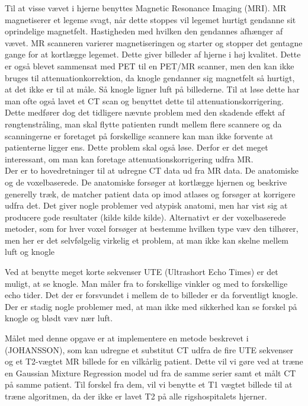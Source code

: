 Til at visse vævet i hjerne benyttes Magnetic Resonance Imaging (MRI). MR
magnetiserer et legeme svagt, når dette stoppes vil legemet hurtigt gendanne
sit oprindelige magnetfelt. Hastigheden med hvilken den gendannes afhænger
af vævet. MR scanneren varierer magnetiseringen og starter og stopper det
gentagne gange for at kortlægge legemet. Dette giver billeder af hjerne i
høj kvalitet. Dette er også blevet sammensat med PET til en PET/MR scanner,
men den kan ikke bruges til attenuationkorrektion, da knogle gendanner sig
magnetfelt så hurtigt, at det ikke er til at måle. Så knogle ligner luft på
billederne. Til at løse dette har man ofte også lavet et CT scan og benyttet
dette til attenuationskorrigering. Dette medfører dog det tidligere nævnte
problem med den skadende effekt af røngtenstråling, man skal flytte patienten
rundt mellem flere scannere og da scanningerne er foretaget på forskellige
scannere kan man ikke forvente at patienterne ligger ens. Dette problem skal
også løse. Derfor er det meget interessant, om man kan foretage
attenuationskorrigering udfra MR. \\

Der er to hovedretninger til at udregne CT data ud fra MR data. De anatomiske
og de voxelbaserede. De anatomiske forsøger at kortlægge hjernen og beskrive
generelly træk, de matcher patient data op imod atlases og forsøger at
korrigere udfra det. Det giver nogle problemer ved atypisk anatomi, men har
vist sig at producere gode resultater (kilde kilde kilde). Alternativt er der
voxelbaserede metoder, som for hver voxel forsøger at bestemme hvilken type
væv den tilhører, men her er det selvfølgelig virkelig et problem, at man ikke
kan skelne mellem luft og knogle

Ved at benytte meget korte sekvenser UTE (Ultrashort Echo Times) er
det muligt, at se knogle. Man måler fra to forskellige vinkler og med to
forskellige echo tider. Det der er forsvundet i mellem de to billeder er
da forventligt knogle. Der er stadig nogle problemer med, at man ikke med
sikkerhed kan se forskel på knogle og blødt væv nær luft.

Målet med denne opgave er at implementere en metode beskrevet i
(JOHANSSON), som kan udregne et substitut CT udfra de fire UTE sekvenser
og et T2-vægtet MR billede for en vilkårlig patient. Dette vil vi gøre ved
at træne en Gaussian Mixture Regression model ud fra de samme serier samt et
målt CT på samme patient. Til forskel fra dem, vil vi benytte et T1 vægtet
billede til at træne algoritmen, da der ikke er lavet T2 på alle
rigshospitalets hjerner.
